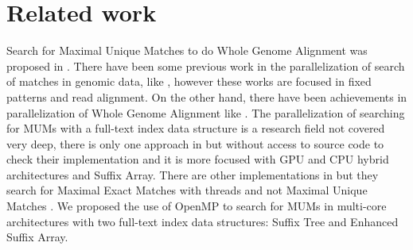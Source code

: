 \documentclass{acm_proc_article-sp}
\begin{document}
\section{Related work}
Search for Maximal Unique Matches to do Whole Genome Alignment was proposed in \cite{Delcher1999}. There have been some previous work in the parallelization of search of matches in genomic data, like \cite{OguzhanKulekci2011,Mongelli,Kouzinopoulos2005}, however these works are focused in fixed patterns and read alignment. On the other hand, there have been achievements in parallelization of Whole Genome Alignment like \cite{Meng2005}. The parallelization of searching for MUMs with a full-text index data structure is a research field not covered very deep, there is only one approach in \cite{Encarnac2011} but without access to source code to check their implementation and it is more focused with GPU and CPU hybrid architectures and Suffix Array. There are other implementations in \cite{Vyverman2013,OguzhanKulekci2011,Khan2009,OhlebuschGK10} but they search for Maximal Exact Matches with threads and not Maximal Unique Matches . We proposed the use of OpenMP to search for MUMs in multi-core architectures with two full-text index data structures: Suffix Tree and Enhanced Suffix Array.
\end{document}
